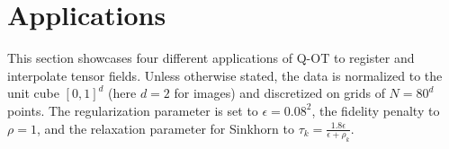 


\section{Applications}
\label{sec:appli}

This section showcases four different applications of Q-OT to register and interpolate tensor fields.
%
Unless otherwise stated, the data is normalized to the unit cube $[0,1]^d$ (here $d=2$ for images) and discretized on grids of $N=80^d$ points. 
%
The regularization parameter is set to $\epsilon=0.08^2$, the fidelity penalty to $\rho=1$, and the relaxation parameter for Sinkhorn to $\tau_k=\tfrac{1.8 \epsilon}{\epsilon+\rho_k}$. 









